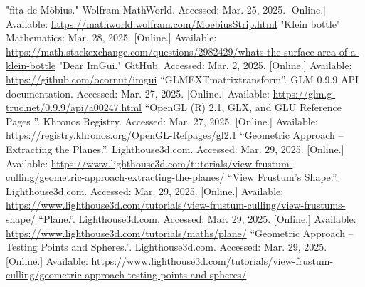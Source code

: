 \documentclass[12pt, a4paper]{article}
\begin{document}
\begin{thebibliography}{9}
        "fita de Möbius."{} Wolfram MathWorld. Accessed: Mar. 25, 2025. [Online.] Available:
        \url{https://mathworld.wolfram.com/MoebiusStrip.html}
        "Klein bottle"{} Mathematics: Mar. 28, 2025. [Online.] Available:
     \url{https://math.stackexchange.com/questions/2982429/whats-the-surface-area-of-a-klein-bottle}
        "Dear ImGui."{} GitHub. Accessed: Mar. 2, 2025. [Online.] Available:
        \url{https://github.com/ocornut/imgui}
        ``GLM\textunderscore EXT\textunderscore matrix\textunderscore transform''. GLM 0.9.9 API
        documentation. Accessed: Mar. 27, 2025. [Online.] Available:
        \url{https://glm.g-truc.net/0.9.9/api/a00247.html}
        ``OpenGL (R) 2.1, GLX, and GLU Reference Pages ''. Khronos Registry.
        Accessed: Mar. 27, 2025. [Online.] Available:
        \url{https://registry.khronos.org/OpenGL-Refpages/gl2.1}
        ``Geometric Approach -- Extracting the Planes.''. Lighthouse3d.com. Accessed:
        Mar. 29, 2025. [Online.] Available:
        \url{https://www.lighthouse3d.com/tutorials/view-frustum-culling/geometric-approach-extracting-the-planes/}
        ``View Frustum’s Shape.''. Lighthouse3d.com. Accessed:
        Mar. 29, 2025. [Online.] Available:
        \url{https://www.lighthouse3d.com/tutorials/view-frustum-culling/view-frustums-shape/}
        ``Plane.''. Lighthouse3d.com. Accessed:
        Mar. 29, 2025. [Online.] Available:
        \url{https://www.lighthouse3d.com/tutorials/maths/plane/}
        ``Geometric Approach -- Testing Points and Spheres.''. Lighthouse3d.com. Accessed:
        Mar. 29, 2025. [Online.] Available:
        \url{https://www.lighthouse3d.com/tutorials/view-frustum-culling/geometric-approach-testing-points-and-spheres/}
\end{thebibliography}
\endgroup
\end{document}
